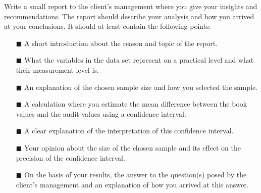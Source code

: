 Write a small report to the client's management where you give your insights and recommendations. The report should describe your analysis and how you arrived at your conclusions. It should at least contain the following points: \\

\begin{itemize}
    \item[$\blacksquare$] A short introduction about the reason and topic of the report.
    \item[$\blacksquare$] What the variables in the data set represent on a practical level and what their measurement level is. 
    \item[$\blacksquare$] An explanation of the chosen sample size and how you selected the sample.
    \item[$\blacksquare$] A calculation where you estimate the mean difference between the book values and the audit values using a confidence interval.
    \item[$\blacksquare$] A clear explanation of the interpretation of this confidence interval.
    \item[$\blacksquare$] Your opinion about the size of the chosen sample and its effect on the precision of the confidence interval. 
    \item[$\blacksquare$] On the basis of your results, the answer to the question(s) posed by the client's management and an explanation of how you arrived at this answer.
\end{itemize}

\clearpage %